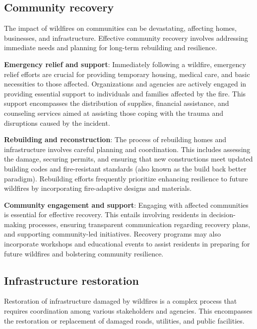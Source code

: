 \documentclass[
  12 pt,
]{Nemilov}
\begin{document}
\subsection{Community recovery}\label{community-recovery}

The impact of wildfires on communities can be devastating, affecting homes, businesses, and infrastructure. Effective community recovery involves addressing immediate needs and planning for long-term rebuilding and resilience.

\textbf{Emergency relief and support}: Immediately following a wildfire, emergency relief efforts are crucial for providing temporary housing, medical care, and basic necessities to those affected. Organizations and agencies are actively engaged in providing essential support to individuals and families affected by the fire. This support encompasses the distribution of supplies, financial assistance, and counseling services aimed at assisting those coping with the trauma and disruptions caused by the incident.

\textbf{Rebuilding and reconstruction}: The process of rebuilding homes and infrastructure involves careful planning and coordination. This includes assessing the damage, securing permits, and ensuring that new constructions meet updated building codes and fire-resistant standards (also known as the build back better paradigm). Rebuilding efforts frequently prioritize enhancing resilience to future wildfires by incorporating fire-adaptive designs and materials.

\textbf{Community engagement and support}: Engaging with affected communities is essential for effective recovery. This entails involving residents in decision-making processes, ensuring transparent communication regarding recovery plans, and supporting community-led initiatives. Recovery programs may also incorporate workshops and educational events to assist residents in preparing for future wildfires and bolstering community resilience.

\subsection{Infrastructure restoration}\label{infrastructure-restoration}

Restoration of infrastructure damaged by wildfires is a complex process that requires coordination among various stakeholders and agencies. This encompasses the restoration or replacement of damaged roads, utilities, and public facilities.
\end{document}
